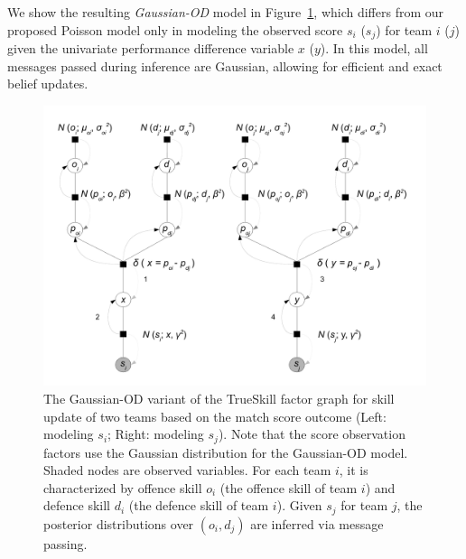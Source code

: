We show the resulting \emph{Gaussian-OD} model in
Figure~\ref{fig:GaussianOD}, which
differs from our proposed Poisson model only in modeling the observed score $s_i$ ($s_j$) for team $i$ ($j$) given the univariate performance difference variable $x$ ($y$). In this model, all messages passed during inference
are Gaussian, allowing for efficient and exact belief updates.

\begin{figure}[t!]
\centerline{\includegraphics[scale=0.35]{modelAndInferenceGaussianGraphicalModel}}
\caption{
The Gaussian-OD variant of the TrueSkill factor graph for skill update of two teams based on the match score outcome (Left: modeling $s_i$; Right: modeling $s_j$). Note that the score observation factors use the Gaussian distribution for the Gaussian-OD model. Shaded nodes are observed variables. For each team $i$, it is characterized by offence skill $o_{i}$ (the offence skill of team $i$) and defence skill $d_{i}$ (the defence skill of
team $i$). Given $s_j$ for team $j$, the posterior distributions over $(o_i,d_j)$ are inferred via message passing.
}
\label{fig:GaussianOD}
\end{figure}

